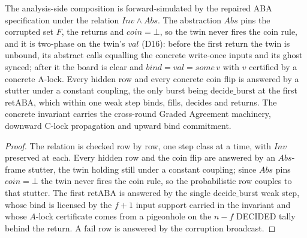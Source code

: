 \begin{theorem}
  \label{thm:aba-coresim}
  \leanok
  The analysis-side composition is forward-simulated by the repaired ABA specification under the relation $Inv \wedge Abs$.
  The abstraction $Abs$ pins the corrupted set $F$, the returns and $coin = \bot$, so the twin never fires the coin rule, and it is two-phase on the twin's $val$ (D16): before the first return the twin is unbound, its abstract calls equalling the concrete write-once inputs and its ghost synced; after it the board is clear and $bind = val = some\,v$ with $v$ certified by a concrete A-lock.
  Every hidden row and every concrete coin flip is answered by a stutter under a constant coupling, the only burst being $\mathrm{decide\_burst}$ at the first $\mathrm{retABA}$, which within one weak step binds, fills, decides and returns.
  The concrete invariant carries the cross-round Graded Agreement machinery, downward C-lock propagation and upward bind commitment.
\end{theorem}

\begin{proof}\leanok
  The relation is checked row by row, one step class at a time, with $Inv$ preserved at each.
  Every hidden row and the coin flip are answered by an $Abs$-frame stutter, the twin holding still under a constant coupling; since $Abs$ pins $coin = \bot$ the twin never fires the coin rule, so the probabilistic row couples to that stutter.
  The first $\mathrm{retABA}$ is answered by the single $\mathrm{decide\_burst}$ weak step, whose bind is licensed by the $f{+}1$ input support carried in the invariant and whose $A$-lock certificate comes from a pigeonhole on the $n-f$ DECIDED tally behind the return.
  A $\mathrm{fail}$ row is answered by the corruption broadcast.
\end{proof}
